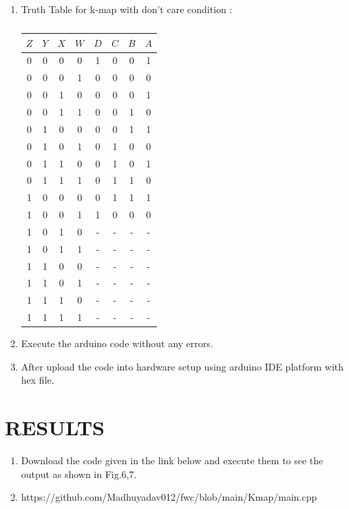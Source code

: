 \documentclass[conference]{IEEEtran}
\begin{document}
\begin{enumerate}
\item {Truth Table for k-map with don't care condition : }

\begin{table}[htbp]
    \centering
\begin{tabular}
{ | c | c | c | c | c | c | c | c | } \hline
$Z$ & $Y$ & $X$ & $W$ & $D$ & $C$ & $B$ & $A$\\\hline
0   & 0   & 0   & 0   & 1  & 0 & 0  & 1 \\
0   & 0   & 0   & 1   & 0  & 0 & 0  & 0 \\
0   & 0   & 1   & 0   & 0  & 0 & 0  & 1 \\
0   & 0   & 1   & 1   & 0  & 0 & 1  & 0 \\
0   & 1   & 0   & 0   & 0  & 0 & 1  & 1 \\  
0   & 1   & 0   & 1   & 0  & 1 & 0  & 0 \\
0   & 1   & 1   & 0   & 0  & 1 & 0  & 1 \\  
0   & 1   & 1   & 1   & 0  & 1 & 1  & 0 \\
1   & 0   & 0   & 0   & 0  & 1 & 1  & 1 \\
1   & 0   & 0   & 1   & 1  & 0 & 0  & 0 \\
1   & 0   & 1   & 0   & -  & - & -  & - \\ 
1   & 0   & 1   & 1   & -  & - & -  & - \\
1   & 1   & 0   & 0   & -  & - & -  & - \\
1   & 1   & 0   & 1   & -  & - & -  & - \\
1   & 1   & 1   & 0   & -  & - & -  & - \\
1   & 1   & 1   & 1   & -  & - & -  & - \\ \hline
\end{tabular}
\vspace{0.1cm}
\caption{\label{tab:widgets}}
\end{table}
	
\item Execute the arduino code without any errors.
\item After upload the code into hardware setup using arduino IDE platform with hex file.
 \end{enumerate}
\newpage
\section{RESULTS}
 \begin{enumerate}
	 \item Download the code given in the link below and execute them to see the output as shown in Fig.6,7. 
	 \item https://github.com/Madhuyadav012/fwc/blob/main/Kmap/main.cpp
 \end{enumerate}
\end{document}
